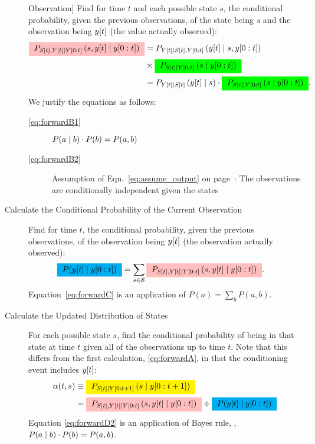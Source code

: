 \begin{description}
  Observation] Find for time $t$ and each possible state $s$, the
  conditional probability, given the previous observations, of the
  state being $s$ and the observation being ${y}{[t]}$ (the value
  actually observed):
  \begin{subequations}
    \label{eq:forwardB}
    \begin{align}
      \mlabel{eq:forwardB1}
      \JointForecast{S}{s}{t} &= P_{\ti{Y}{t} \given 
        \ti{S}{t},\ts{Y}{0}{t}}\left(\ti{y}{t} \given s, \ts{y}{0}{t}
      \right) \nonumber \\& \times \StateForecast{S}{s}{t}\\
      \mlabel{eq:forwardB2}
      &= P_{\ti{Y}{t} \given  \ti{S}{t}}\left(\ti{y}{t} \given s \right) \cdot
      \StateForecast{S}{s}{t} .
    \end{align}
  \end{subequations}
We justify the equations as follows:
\begin{description}
\item[\eqref{eq:forwardB1}]  $P(a\mid b)\cdot P(b) = P(a,b)$
\item[\eqref{eq:forwardB2}] Assumption of
  Eqn.~\eqref{eq:assume_output} on page~\pageref{eq:assume_output}:
  The observations are conditionally independent given the states
\end{description}
\item[Calculate the Conditional Probability of the Current Observation]
  Find for time $t$, the conditional probability, given the previous
  observations, of the observation being ${y}{[t]}$ (the observation actually
  observed):
  \begin{align}
    \mlabel{eq:forwardC}
    \gammax &= \sum_{s \in \states} \JointForecast{S}{s}{t} .
  \end{align}
Equation~\eqref{eq:forwardC} is an application of $P(a) = \sum_b P(a,b)$.
\item[Calculate the Updated Distribution of States] For each possible
  state $s$, find the conditional probability of being in that state
  at time $t$ given all of the observations up to time $t$.  Note that
  this differs from the first calculation, \eqref{eq:forwardA}, in that
  the conditioning event includes ${y}{[t]}$:%
  \begin{subequations}
    \label{eq:forwardD}
    \begin{align}
      \mlabel{eq:forwardD1}
      \alpha(t,s) &\equiv
      \alphax{S}{t}{t+1}{s} \\
      \mlabel{eq:forwardD2}
      &= \JointForecast{S}{s}{t} \div \gammax
    \end{align}
  \end{subequations}
  Equation \eqref{eq:forwardD2} is an application of Bayes rule, \ie,
  $P(a\mid b)\cdot P(b) = P(a,b)$.
\end{description}

